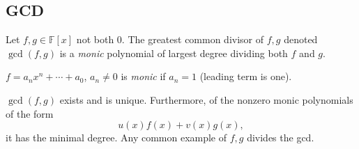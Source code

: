 \documentclass[12pt,oneside]{article}
\begin{document}
\subsection{GCD}
\begin{definition}
  Let $f,g \in \mathbb{F}[x]$ not both 0. The greatest common divisor of $f,g$ denoted $\gcd (f,g)$ is a \emph{monic} polynomial of largest degree dividing both $f$ and $g$.
\end{definition}

\begin{definition}[Monic]
  $f = a_n x^{n} + \cdots + a_0$, $a_n \neq 0$ is \emph{monic} if $a_n = 1$ (leading term is one).
\end{definition}

\begin{theorem}[GCD]
  $\gcd (f,g) $ exists and is unique. Furthermore, of the nonzero monic polynomials of the form $$u(x) f(x) + v(x) g(x),$$ it has the minimal degree. Any common example of $f,g$ divides the gcd.
\end{theorem}
\end{document}
